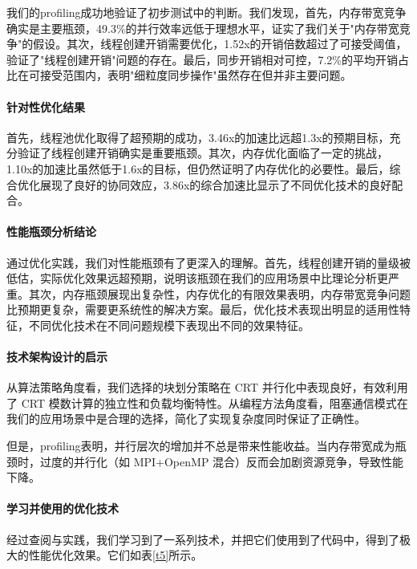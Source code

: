 \documentclass[a4paper]{article}
\begin{document}
我们的profiling成功地验证了初步测试中的判断。我们发现，首先，内存带宽竞争确实是主要瓶颈，49.3\%的并行效率远低于理想水平，证实了我们关于"内存带宽竞争"的假设。其次，线程创建开销需要优化，1.52x的开销倍数超过了可接受阈值，验证了"线程创建开销"问题的存在。最后，同步开销相对可控，7.2\%的平均开销占比在可接受范围内，表明"细粒度同步操作"虽然存在但并非主要问题。

\paragraph{针对性优化结果}

首先，线程池优化取得了超预期的成功，3.46x的加速比远超1.3x的预期目标，充分验证了线程创建开销确实是重要瓶颈。其次，内存优化面临了一定的挑战，1.10x的加速比虽然低于1.6x的目标，但仍然证明了内存优化的必要性。最后，综合优化展现了良好的协同效应，3.86x的综合加速比显示了不同优化技术的良好配合。

\paragraph{性能瓶颈分析结论}

通过优化实践，我们对性能瓶颈有了更深入的理解。首先，线程创建开销的量级被低估，实际优化效果远超预期，说明该瓶颈在我们的应用场景中比理论分析更严重。其次，内存瓶颈展现出复杂性，内存优化的有限效果表明，内存带宽竞争问题比预期更复杂，需要更系统性的解决方案。最后，优化技术表现出明显的适用性特征，不同优化技术在不同问题规模下表现出不同的效果特征。

\paragraph{技术架构设计的启示}

从算法策略角度看，我们选择的块划分策略在 CRT 并行化中表现良好，有效利用了 CRT 模数计算的独立性和负载均衡特性。从编程方法角度看，阻塞通信模式在我们的应用场景中是合理的选择，简化了实现复杂度同时保证了正确性。

但是，profiling表明，并行层次的增加并不总是带来性能收益。当内存带宽成为瓶颈时，过度的并行化（如 MPI+OpenMP 混合）反而会加剧资源竞争，导致性能下降。

\paragraph{学习并使用的优化技术}

经过查阅与实践，我们学习到了一系列技术，并把它们使用到了代码中，得到了极大的性能优化效果。它们如表\ref{t5}所示。
\end{document}
